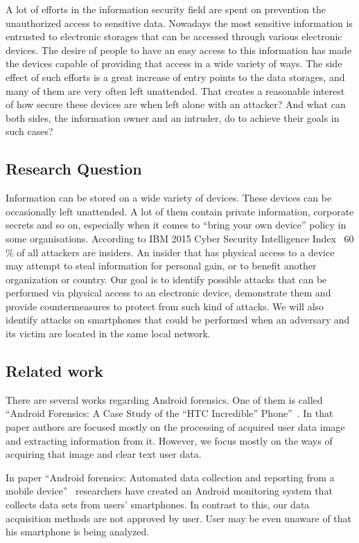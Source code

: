 A lot of efforts in the information security field are spent on prevention the unauthorized access to sensitive data. Nowadays the most sensitive information is entrusted to electronic storages that can be accessed through various electronic devices. The desire of people to have an easy access to this information has made the devices capable of providing that access in a wide variety of ways. The side effect of such efforts is a great increase of entry points to the data storages, and many of them are very often left unattended. That creates a reasonable interest of how secure these devices are when left alone with an attacker? And what can both sides, the information owner and an intruder, do to achieve their goals in such cases?


\subsection{Research Question}

Information can be stored on a wide variety of devices. These devices can be occasionally  left unattended. A lot of them contain private information, corporate secrets and so on, especially when it comes to “bring your own device” policy in some organisations. According to  IBM 2015 Cyber Security Intelligence Index~\cite{rsi-index} 60 \% of all attackers are insiders. An insider that has physical access to a device may attempt to steal information for personal gain, or to benefit another organization or country. Our goal is to identify possible attacks that can be performed via physical access to an electronic device, demonstrate them and provide countermeasures to protect from such kind of attacks. We will also identify attacks on smartphones that could be performed when an adversary and its victim are located in the same local network.


\subsection{Related work}

There are several works regarding Android forensics. One of them is called “Android Forensics: A Case Study of the “HTC Incredible” Phone”~\cite{book2}. In that paper authors are focused mostly on the processing of acquired user data image and extracting information from it. However, we focus mostly on the ways of acquiring that image and clear text user data.

In paper “Android forensics: Automated data collection and reporting from a mobile device”~\cite{book3} researchers have created an Android monitoring system that collects data sets from users’ smartphones. In contrast to this, our data acquisition methods are not approved by user. User may be even unaware of that his smartphone is being analyzed.

